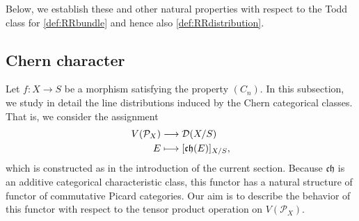 \documentclass[JEP,XML,SOM,Unicode,published]{cedram}
\newcommand\mto{\mathchoice{\longmapsto}{\mapsto}{\mapsto}{\mapsto}}
\theoremstyle{plain}
\theoremstyle{definition}
\newcommand{\Dcal}{\mathcal D}
\newcommand{\Pcal}{\mathcal P}
\newcommand{\chfrak}{\mathfrak {ch}}
\begin{document}
Below, we establish these and other natural properties with respect to the Todd class for \eqref{def:RRbundle} and hence also \eqref{def:RRdistribution}.

\subsection{Chern character}
Let $f\colon X\to S$ be a morphism satisfying the property $(C_{n})$. In this subsection, we study in detail the line distributions induced by the Chern categorical classes. That is, we consider the assignment
\begin{displaymath}
\begin{split}
V(\Pcal_{X})&\longrightarrow \Dcal(X/S)\\
E&\mto [\chfrak(E)]_{X/S},
\end{split}
\end{displaymath}
which is constructed as in the introduction of the current section. Because $\chfrak$ is an additive categorical characteristic class, this functor has a natural structure of functor of commutative Picard categories. Our aim is to describe the behavior of this functor with respect to the tensor product operation on $V(\Pcal_{X})$.
\end{document}
